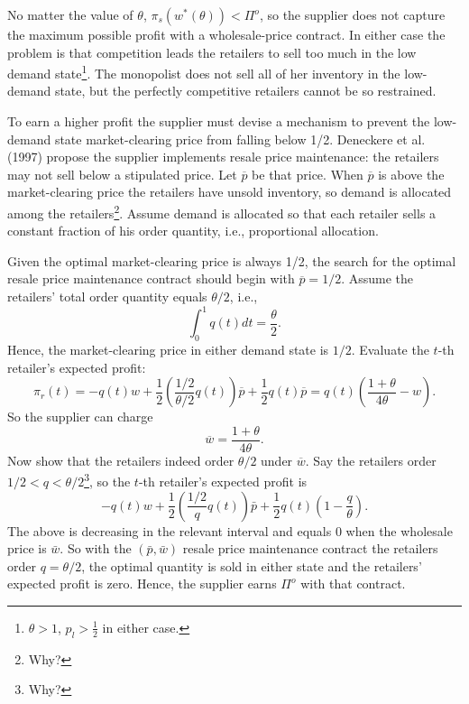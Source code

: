 No matter the value of $\theta$, $\pi_s(w^*(\theta))<\Pi^o$, so the supplier does not capture the maximum possible profit with a wholesale-price contract. In either case the problem is that competition leads the retailers to sell too much in the low demand state\footnote{$\theta> 1$, $p_l>\frac{1}{2}$ in either case.}. The monopolist does not sell all of her inventory in the low-demand state, but the perfectly competitive retailers cannot be so restrained.
\newcommand{\op}{\overline{p}}

To earn a higher profit the supplier must devise a mechanism to prevent
the low-demand state market-clearing price from falling below 1/2. Deneckere et al. (1997) propose the supplier implements resale price maintenance: the retailers may not sell below a stipulated price. Let $\op$ be that price. When $\op$ is above the market-clearing price the retailers have unsold inventory, so demand is allocated among the retailers\footnote{Why?}. Assume demand is allocated so that each retailer sells a constant fraction of his order quantity, i.e., proportional allocation.

Given the optimal market-clearing price is always 1/2, the search for the
optimal resale price maintenance contract should begin with $\op=1/2$. Assume the retailers' total order quantity equals $\theta/2$, i.e.,
\begin{equation}\label{eq:5.4}
    \int_0^1 q(t)dt=\frac{\theta}{2}.
\end{equation}
Hence, the market-clearing price in either demand state is $1/2$. Evaluate the $t$-th retailer's expected profit:
\begin{equation*}
    \pi_r(t)=-q(t)w+\frac{1}{2}\left(\frac{1/2}{\theta/2}q(t)\right)\op+\frac{1}{2}q(t)\op=q(t)\left(\frac{1+\theta}{4\theta}-w\right).
\end{equation*}
So the supplier can charge 
$$\overline{w}=\frac{1+\theta}{4\theta}.$$
Now show that the retailers indeed order $\theta/2$ under $\overline{w}$. 
Say the retailers order $1 / 2<q<\theta / 2$\footnote{Why?}, so the $t$-th retailer's expected profit is
$$
-q(t) w+\frac{1}{2}\left(\frac{1 / 2}{q} q(t)\right) \bar{p}+\frac{1}{2} q(t)\left(1-\frac{q}{\theta}\right) .
$$
The above is decreasing in the relevant interval and equals 0 when the wholesale price is $\bar{w}$. So with the $(\bar{p}, \bar{w})$ resale price maintenance contract the retailers order $q=\theta / 2$, the optimal quantity is sold in either state and the retailers' expected profit is zero. Hence, the supplier earns $\Pi^{o}$ with that contract.











